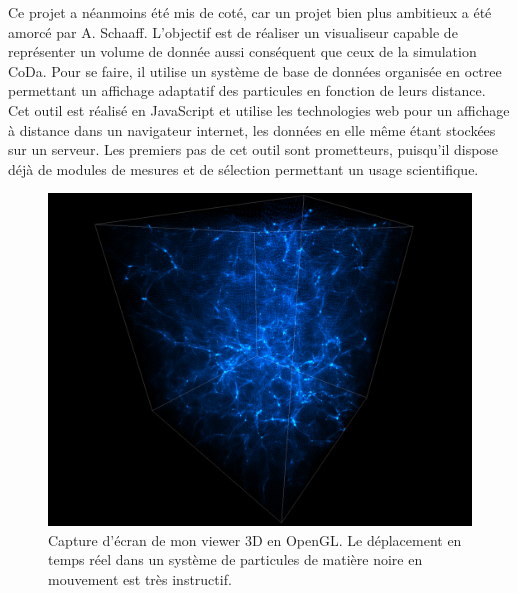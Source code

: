 Ce projet a néanmoins été mis de coté, car un projet bien plus ambitieux a été amorcé par A. Schaaff.
L'objectif est de réaliser un visualiseur capable de représenter un volume de donnée aussi conséquent que ceux de la simulation CoDa.
Pour se faire, il utilise un système de base de données organisée en octree permettant un affichage adaptatif des particules en fonction de leurs distance.
Cet outil est réalisé en JavaScript et utilise les technologies web pour un affichage à distance dans un navigateur internet, les données en elle même étant stockées sur un serveur.
Les premiers pas de cet outil sont prometteurs, puisqu'il dispose déjà de modules de mesures et de sélection permettant un usage scientifique.




\begin{figure}
        \includegraphics[width=.95\linewidth]{img/04/part.png} 
        \caption[Projection 3D]{Capture d’écran de mon viewer 3D en OpenGL.
        Le déplacement en temps réel dans un système de particules de matière noire en mouvement est très instructif.}
 		\label{fig:viewer}
\end{figure}


%
%


